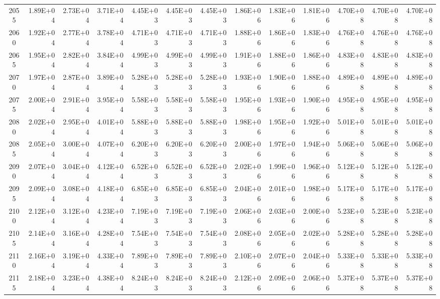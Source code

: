 \documentclass{article}
\begin{document}
\begin{table}
\begin{tabular}{crrr|rrr|rrr|rrr}
2055     & 1.89E+04   & 2.73E+04   & 3.71E+04   & 4.45E+03   & 4.45E+03   & 4.45E+03   & 1.86E+06   & 1.83E+06   & 1.81E+06   & 4.70E+08   & 4.70E+08   & 4.70E+08   \\
2060     & 1.92E+04   & 2.77E+04   & 3.78E+04   & 4.71E+03   & 4.71E+03   & 4.71E+03   & 1.88E+06   & 1.86E+06   & 1.83E+06   & 4.76E+08   & 4.76E+08   & 4.76E+08   \\
2065     & 1.95E+04   & 2.82E+04   & 3.84E+04   & 4.99E+03   & 4.99E+03   & 4.99E+03   & 1.91E+06   & 1.88E+06   & 1.86E+06   & 4.83E+08   & 4.83E+08   & 4.83E+08   \\
2070     & 1.97E+04   & 2.87E+04   & 3.89E+04   & 5.28E+03   & 5.28E+03   & 5.28E+03   & 1.93E+06   & 1.90E+06   & 1.88E+06   & 4.89E+08   & 4.89E+08   & 4.89E+08   \\
2075     & 2.00E+04   & 2.91E+04   & 3.95E+04   & 5.58E+03   & 5.58E+03   & 5.58E+03   & 1.95E+06   & 1.93E+06   & 1.90E+06   & 4.95E+08   & 4.95E+08   & 4.95E+08   \\
2080     & 2.02E+04   & 2.95E+04   & 4.01E+04   & 5.88E+03   & 5.88E+03   & 5.88E+03   & 1.98E+06   & 1.95E+06   & 1.92E+06   & 5.01E+08   & 5.01E+08   & 5.01E+08   \\
2085     & 2.05E+04   & 3.00E+04   & 4.07E+04   & 6.20E+03   & 6.20E+03   & 6.20E+03   & 2.00E+06   & 1.97E+06   & 1.94E+06   & 5.06E+08   & 5.06E+08   & 5.06E+08   \\
2090     & 2.07E+04   & 3.04E+04   & 4.12E+04   & 6.52E+03   & 6.52E+03   & 6.52E+03   & 2.02E+06   & 1.99E+06   & 1.96E+06   & 5.12E+08   & 5.12E+08   & 5.12E+08   \\
2095     & 2.09E+04   & 3.08E+04   & 4.18E+04   & 6.85E+03   & 6.85E+03   & 6.85E+03   & 2.04E+06   & 2.01E+06   & 1.98E+06   & 5.17E+08   & 5.17E+08   & 5.17E+08   \\
2100     & 2.12E+04   & 3.12E+04   & 4.23E+04   & 7.19E+03   & 7.19E+03   & 7.19E+03   & 2.06E+06   & 2.03E+06   & 2.00E+06   & 5.23E+08   & 5.23E+08   & 5.23E+08   \\
2105     & 2.14E+04   & 3.16E+04   & 4.28E+04   & 7.54E+03   & 7.54E+03   & 7.54E+03   & 2.08E+06   & 2.05E+06   & 2.02E+06   & 5.28E+08   & 5.28E+08   & 5.28E+08   \\
2110     & 2.16E+04   & 3.19E+04   & 4.33E+04   & 7.89E+03   & 7.89E+03   & 7.89E+03   & 2.10E+06   & 2.07E+06   & 2.04E+06   & 5.33E+08   & 5.33E+08   & 5.33E+08   \\
2115     & 2.18E+04   & 3.23E+04   & 4.38E+04   & 8.24E+03   & 8.24E+03   & 8.24E+03   & 2.12E+06   & 2.09E+06   & 2.06E+06   & 5.37E+08   & 5.37E+08   & 5.37E+08   \\

\end{tabular}
\end{table}
\end{document}
